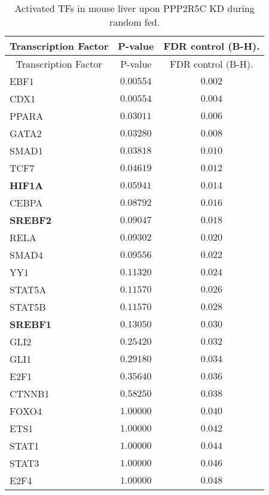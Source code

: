 \begin{longtable}{lcc}
\caption{Activated TFs in mouse liver upon PPP2R5C KD during random fed.}
\label{tab:tab2.3}
\tabularnewline
\toprule
\multicolumn{1}{c}{Transcription Factor}&\multicolumn{1}{c}{P-value}&\multicolumn{1}{c}{FDR control (B-H).}\tabularnewline
\midrule
\endfirsthead


\multicolumn{1}{c}{Transcription Factor}&\multicolumn{1}{c}{P-value}&\multicolumn{1}{c}{FDR control (B-H).}\tabularnewline
\midrule
\endhead
\hline
\endfoot
EBF1&$0.00554$&$0.002$\tabularnewline
CDX1&$0.00554$&$0.004$\tabularnewline
PPARA&$0.03011$&$0.006$\tabularnewline
GATA2&$0.03280$&$0.008$\tabularnewline
SMAD1&$0.03818$&$0.010$\tabularnewline
TCF7&$0.04619$&$0.012$\tabularnewline
\textbf{HIF1A}&$0.05941$&$0.014$\tabularnewline
CEBPA&$0.08792$&$0.016$\tabularnewline
\textbf{SREBF2}&$0.09047$&$0.018$\tabularnewline
RELA&$0.09302$&$0.020$\tabularnewline
SMAD4&$0.09556$&$0.022$\tabularnewline
YY1&$0.11320$&$0.024$\tabularnewline
STAT5A&$0.11570$&$0.026$\tabularnewline
STAT5B&$0.11570$&$0.028$\tabularnewline
\textbf{SREBF1}&$0.13050$&$0.030$\tabularnewline
GLI2&$0.25420$&$0.032$\tabularnewline
GLI1&$0.29180$&$0.034$\tabularnewline
E2F1&$0.35640$&$0.036$\tabularnewline
CTNNB1&$0.58250$&$0.038$\tabularnewline
FOXO4&$1.00000$&$0.040$\tabularnewline
ETS1&$1.00000$&$0.042$\tabularnewline
STAT1&$1.00000$&$0.044$\tabularnewline
STAT3&$1.00000$&$0.046$\tabularnewline
E2F4&$1.00000$&$0.048$\tabularnewline
\bottomrule
\end{longtable}
